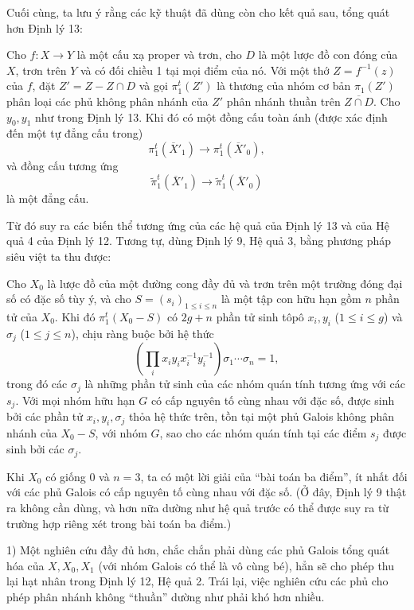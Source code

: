 Cuối cùng, ta lưu ý rằng các kỹ thuật đã dùng còn cho kết quả sau, tổng quát
hơn Định lý 13:

 Cho $f:X\longrightarrow Y$ là một cấu xạ proper và trơn,
cho $D$ là một lược đồ con đóng của $X$, trơn trên $Y$ và có đối chiều 1 tại
mọi điểm của nó. Với một thớ $Z=f^{-1}(z)$ của $f$, đặt $Z'=Z-Z\cap D$ và gọi
$\pi_1^t(Z')$ là thương của nhóm cơ bản $\pi_1(Z')$ phân loại các phủ không
phân nhánh của $Z'$ phân nhánh thuần trên $\overline{Z\cap D}$. Cho $y_0,y_1$
như trong Định lý 13. Khi đó có một đồng cấu toàn ánh (được xác định đến một tự
đẳng cấu trong)
\[
  \pi_1^t(\overline X'_1)\longrightarrow\pi_1^t(\overline X'_0),
\]
và đồng cấu tương ứng
\[
  \widetilde\pi_1^t(\overline X'_1)
  \longrightarrow\widetilde\pi_1^t(\overline X'_0)
\]
là một đẳng cấu.

Từ đó suy ra các biến thể tương ứng của các hệ quả của Định lý 13 và của Hệ
quả 4 của Định lý 12. Tương tự, dùng Định lý 9, Hệ quả 3, bằng phương pháp
siêu việt ta thu được:

 Cho $X_0$ là lược đồ của một đường cong đầy đủ và trơn trên
một trường đóng đại số có đặc số tùy ý, và cho
$S=(s_i)_{1\le i\le n}$ là một tập con hữu hạn gồm $n$ phần tử của $X_0$. Khi
đó $\pi_1^t(X_0-S)$ có $2g+n$ phần tử sinh tôpô
$x_i,y_i$ ($1\le i\le g$) và $\sigma_j$ ($1\le j\le n$), chịu ràng buộc bởi
hệ thức
\[
  \left(\prod_i x_i y_i x_i^{-1}y_i^{-1}\right)
  \sigma_1\cdots\sigma_n=1,
\]
trong đó các $\sigma_j$ là những phần tử sinh của các nhóm quán tính tương ứng
với các $s_j$. Với mọi nhóm hữu hạn $G$ có cấp nguyên tố cùng nhau với đặc số,
được sinh bởi các phần tử $x_i,y_i,\sigma_j$ thỏa hệ thức trên, tồn tại một
phủ Galois không phân nhánh của $X_0-S$, với nhóm $G$, sao cho các nhóm quán
tính tại các điểm $s_j$ được sinh bởi các $\sigma_j$.

Khi $X_0$ có giống 0 và $n=3$, ta có một lời giải của “bài toán ba điểm”, ít
nhất đối với các phủ Galois có cấp nguyên tố cùng nhau với đặc số. (Ở đây,
Định lý 9 thật ra không cần dùng, và hơn nữa dường như hệ quả trước có thể được
suy ra từ trường hợp riêng xét trong bài toán ba điểm.)


1) Một nghiên cứu đầy đủ hơn, chắc chắn phải dùng các phủ Galois tổng quát hóa
của $X,X_0,X_1$ (với nhóm Galois có thể là vô cùng bé), hẳn sẽ cho phép thu
lại hạt nhân trong Định lý 12, Hệ quả 2. Trái lại, việc nghiên cứu các phủ cho
phép phân nhánh không “thuần” dường như phải khó hơn nhiều.

